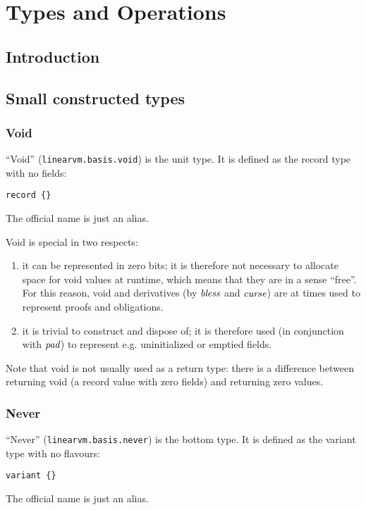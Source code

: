 \documentclass[a4paper]{book}
\newcommand\tyBless{{\ensuremath\textit{bless}}}
\newcommand\tyCurse{{\ensuremath\textit{curse}}}
\newcommand\tyPad{{\ensuremath\textit{pad}}}
\begin{document}

\part{Types and Operations}

\chapter{Introduction}
\chapter{Small constructed types}

\section{Void}
``Void'' (\texttt{linearvm.basis.void}) is the unit type.
It is defined as the record type with no fields:
\begin{center}
  \verb|record {}|
\end{center}
The official name is just an alias.

Void is special in two respects:
\begin{enumerate}
\item it can be represented in zero bits;
  it is therefore not necessary to allocate space for void values at
  runtime, which means that they are in a sense ``free''.
  For this reason, void and derivatives (by $\tyBless$ and
  $\tyCurse$) are at times used to represent proofs and obligations.
\item it is trivial to construct and dispose of;
  it is therefore used (in conjunction with $\tyPad$) to represent e.g.
  uninitialized or emptied fields.
\end{enumerate}

Note that void is not usually used as a return type: there is a
difference between returning void (a record value with zero fields)
and returning zero values.

\section{Never}
``Never'' (\texttt{linearvm.basis.never}) is the bottom type.
It is defined as the variant type with no flavours:
\begin{center}
  \verb|variant {}|
\end{center}
The official name is just an alias.
\end{document}
